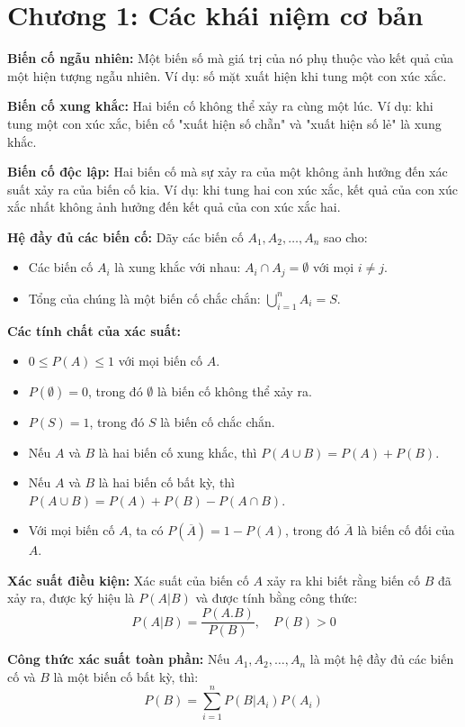 \documentclass[12pt,a4paper]{article}
\begin{document}
\section*{Chương 1: Các khái niệm cơ bản}
\textbf{Biến cố ngẫu nhiên:} Một biến số mà giá trị của nó phụ thuộc vào kết quả của một hiện tượng ngẫu nhiên. Ví dụ: số mặt xuất hiện khi tung một con xúc xắc.

\textbf{Biến cố xung khắc:} Hai biến cố không thể xảy ra cùng một lúc. Ví dụ: khi tung một con xúc xắc, biến cố "xuất hiện số chẵn" và "xuất hiện số lẻ" là xung khắc.

\textbf{Biến cố độc lập:} Hai biến cố mà sự xảy ra của một không ảnh hưởng đến xác suất xảy ra của biến cố kia. Ví dụ: khi tung hai con xúc xắc, kết quả của con xúc xắc nhất không ảnh hưởng đến kết quả của con xúc xắc hai.

\textbf{Hệ đầy đủ các biến cố:} Dãy các biến cố $A_1, A_2, \ldots, A_n$ sao cho:
\begin{itemize}
    \item Các biến cố $A_i$ là xung khắc với nhau: $A_i \cap A_j = \emptyset$ với mọi $i \neq j$.
    \item Tổng của chúng là một biến cố chắc chắn: $\bigcup_{i=1}^{n} A_i = S$.
\end{itemize}

\textbf{Các tính chất của xác suất:}
\begin{itemize}
    \item $0 \leq P(A) \leq 1$ với mọi biến cố $A$.
    \item $P(\emptyset) = 0$, trong đó $\emptyset$ là biến cố không thể xảy ra.
    \item $P(S) = 1$, trong đó $S$ là biến cố chắc chắn.
    \item Nếu $A$ và $B$ là hai biến cố xung khắc, thì $P(A \cup B) = P(A) + P(B)$.
    \item Nếu $A$ và $B$ là hai biến cố bất kỳ, thì $P(A \cup B) = P(A) + P(B) - P(A \cap B)$.
    \item Với mọi biến cố $A$, ta có $P(\overline{A}) = 1 - P(A)$, trong đó $\overline{A}$ là biến cố đối của $A$.
\end{itemize}

\textbf{Xác suất điều kiện:} Xác suất của biến cố $A$ xảy ra khi biết rằng biến cố $B$ đã xảy ra, được ký hiệu là $P(A|B)$ và được tính bằng công thức:
\[P(A|B) = \frac{P(A.B)}{P(B)}, \quad P(B) > 0\]

\textbf{Công thức xác suất toàn phần:} Nếu $A_1, A_2, \ldots, A_n$ là một hệ đầy đủ các biến cố và $B$ là một biến cố bất kỳ, thì:
\[P(B) = \sum_{i=1}^{n} P(B|A_i)P(A_i)\]
\end{document}
